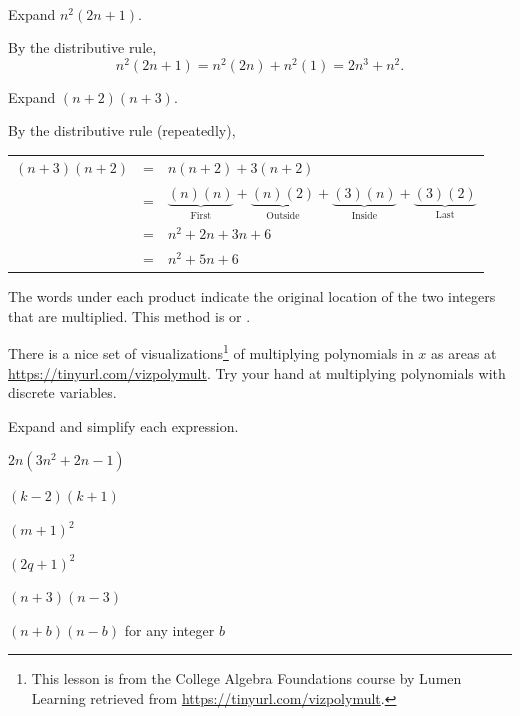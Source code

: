 \begin{exam}
\label{exam_mult_polys}  
~
    \begin{apart}
        \item Expand $n^2(2n+1)$.
            \begin{soln}
                By the distributive rule, 
                $$n^2(2n+1) = n^2(2n) + n^2(1) = 2n^3+n^2.$$
            \end{soln}
        \item Expand $(n+2)(n+3)$.
            \begin{soln}
                By the distributive rule (repeatedly),
                \begin{center}
                    \begin{tabular}{lll}
                    $(n+3)(n+2)$ &=& $n(n+2) + 3(n+2)$ \\ 
                    &=& $\underbrace{(n)(n)}_{\text{First}} 
                    +\underbrace{(n)(2)}_{\text{Outside}} 
                    + \underbrace{(3)(n)}_{\text{Inside}} + \underbrace{(3)(2)}_{\text{Last}}$ \\ 
                    &=& $n^2 + 2n + 3n + 6$ \\
                    &=& $n^2+5n + 6$           
                    \end{tabular}
                \end{center}
                The words under each product indicate the original location of the two integers that are multiplied. This method is  or . 
            \end{soln}  
    \end{apart}
\end{exam}

There is a nice set of visualizations\footnote{This lesson is from the College Algebra Foundations course by Lumen Learning retrieved from \url{https://tinyurl.com/vizpolymult}.} of multiplying polynomials in $x$ as areas at \url{https://tinyurl.com/vizpolymult}.  Try your hand at multiplying polynomials with discrete variables.

\begin{act} 
\label{act_mult_polys}
    Expand and simplify each expression.
    \begin{apart}
        \item $2n(3n^2+2n-1)$
        \item $(k-2)(k+1)$
        \item $(m+1)^2$
        \item $(2q+1)^2$
        \item $(n+3)(n-3)$  
        \item $(n+b)(n-b)$ for any integer $b$
    \end{apart}    
\end{act}

